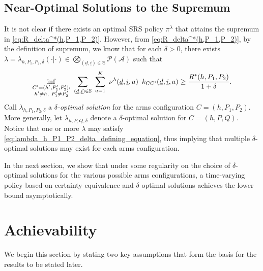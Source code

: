 \subsection{Near-Optimal Solutions to the Supremum}
It is not clear if there exists an optimal SRS policy $\pi^\lambda$ that {\color{black} attains  the supremum in \eqref{eq:R_delta^*(h,P_1,P_2)}. However, from \eqref{eq:R_delta^*(h,P_1,P_2)}, by the definition of supremum, we know that for each $\delta>0$, there exists $\lambda=\lambda_{h, P_1, P_2, \delta}(\cdot|\cdot) \in \bigotimes \limits_{(\underline{d},\underline{i})\in\mathbb{S}} \mathcal{P}(\mathcal{A})$} such that
\begin{equation}
\inf\limits_{\substack{C'=(h', P_1', P_2'):\\h'\neq h,~P_1'\neq P_2'}} ~ \sum\limits_{(\underline{d},\underline{i})\in\mathbb{S}}~\sum\limits_{a=1}^{K}  ~\nu^\lambda(\underline{d},\underline{i},a) \,\textcolor{black}~{k_{CC'}(\underline{d}, \underline{i}, a)} \geq \frac{R^*(h, P_1, P_2)}{1+\delta}.
	\label{eq:lambda_h_P1_P2_delta_defining_equation}
\end{equation}
Call $\lambda_{h, P_1, P_2, \delta}$ a {\em $\delta$-optimal solution} for the arms configuration $C=(h, P_1, P_2)$. 
More generally, let $\lambda_{h, P, Q, \delta}$ denote a $\delta$-optimal solution for $C=(h, P, Q)$. 
Notice that one or more $\lambda$ may satisfy \eqref{eq:lambda_h_P1_P2_delta_defining_equation}, thus implying that multiple $\delta$-optimal solutions may exist for each arms configuration. 

In the next section, we show that under some regularity on the choice of $\delta$-optimal solutions for the various possible arms configurations, a time-varying policy based on certainty equivalence and $\delta$-optimal solutions achieves the lower bound asymptotically.

\section{Achievability}
\label{sec:achievability}
We begin this section by stating two key assumptions that form the basis for the results to be stated later.

